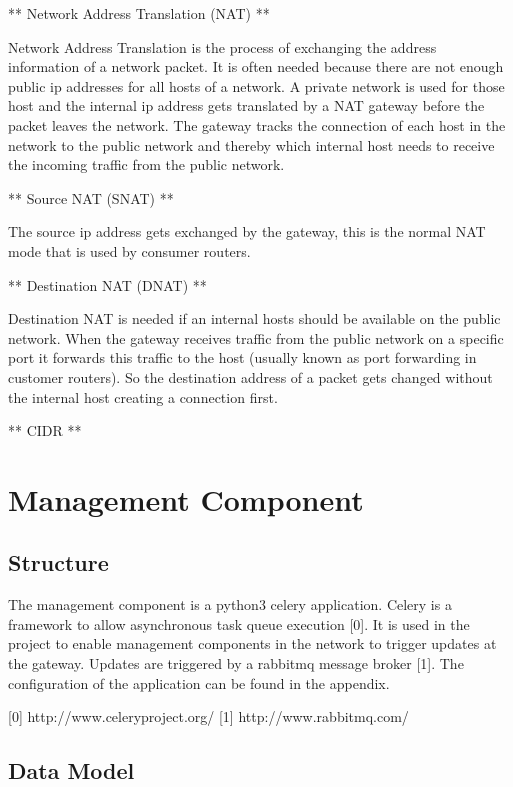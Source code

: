** Network Address Translation (NAT) **

Network Address Translation is the process of exchanging the address
information of a network packet. It is often needed because there are
not enough public ip addresses for all hosts of a network. A private
network is used for those host and the internal ip address gets
translated by a NAT gateway before the packet leaves the network. The
gateway tracks the connection of each host in the network to the public
network and thereby which internal host needs to receive the incoming
traffic from the public network.

** Source NAT (SNAT) **

The source ip address gets exchanged by the gateway, this is the normal
NAT mode that is used by consumer routers.

** Destination NAT (DNAT) **

Destination NAT is needed if an internal hosts should be available on
the public network. When the gateway receives traffic from the public
network on a specific port it forwards this traffic to the host (usually
known as port forwarding in customer routers). So the destination
address of a packet gets changed without the internal host creating a
connection first.

** CIDR **

\section{Management Component}\label{management-component}

\subsection{Structure}\label{structure}

The management component is a python3 celery application. Celery is a
framework to allow asynchronous task queue execution {[}0{]}. It is used
in the project to enable management components in the network to trigger
updates at the gateway. Updates are triggered by a rabbitmq message
broker {[}1{]}. The configuration of the application can be found in the
appendix.

{[}0{]} http://www.celeryproject.org/ {[}1{]} http://www.rabbitmq.com/

\subsection{Data Model}\label{data-model}

